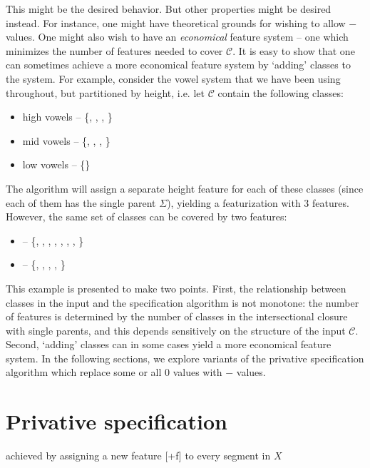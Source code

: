 \documentclass[11pt, oneside]{article}   	%
\begin{document}
This might be the desired behavior. But other properties might be desired instead. For instance, one might have theoretical grounds for wishing to allow $-$ values. One might also wish to have an \textit{economical} feature system -- one which minimizes the number of features needed to cover $\mathcal C$. It is easy to show that one can sometimes achieve a more economical  feature system by `adding' classes to the system. For example, consider the vowel system that we have been using throughout, but partitioned by height, i.e. let $\mathcal C$ contain the following classes: \begin{itemize}
    \item high vowels -- \{, , , \}
    \item mid vowels -- \{, \textipa{\oe}, , \}
    \item low vowels -- \{\}
    \end{itemize}
The algorithm will assign a separate height feature for each of these classes (since each of them has the single parent $\Sigma$), yielding a featurization with 3 features. However, the same set of classes can be covered by two features: \begin{itemize}
    \item {} -- \{, , , , , \textipa{\oe}, , \}
    \item {} -- \{, \textipa{\oe}, , , \}
    \end{itemize}
This example is presented to make two points. First, the relationship between classes in the input and the specification algorithm is not monotone: the number of features is determined by the number of classes in the intersectional closure with single parents, and this depends sensitively on the structure of the input $\mathcal C$. Second, `adding' classes can in some cases yield a more economical feature system. In the following sections, we explore variants of the privative specification algorithm which replace some or all $0$ values with $-$ values.

\section{Privative specification}
achieved by assigning a new feature [+f] to every segment in $X$
\end{document}
